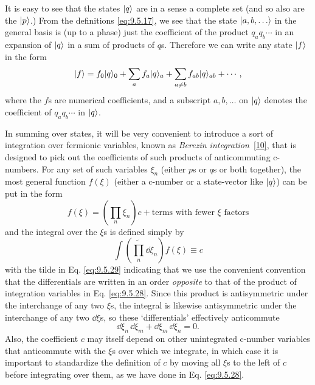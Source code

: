 It is easy to see that the states $\lvert q\rangle$ are in a sense a complete set (and
so also are the $\lvert p\rangle$.) From the definitions \eqref{eq:9.5.17}, we see that the
state $\lvert a,b,\ldots\rangle$ in the general basis is (up to a phase) just the
coefficient of the product $q_aq_b\cdots$ in an expansion of $\lvert q\rangle$ in a
sum of products of $q$s. Therefore we can write any state $\lvert f\rangle$ in the
form
\[
\lvert f\rangle=f_0\lvert q\rangle_0+\sum_a f_a\lvert q\rangle_a
 +\sum_{a\ne b}f_{ab}\lvert q\rangle_{ab}+\cdots,
\]
where the $f$s are numerical coefficients, and a subscript $a,b,\ldots$ on
$\lvert q\rangle$ denotes the coefficient of $q_aq_b\cdots$ in $\lvert q\rangle$.

In summing over states, it will be very convenient to introduce a sort of
integration over fermionic variables, known as \emph{Berezin integration}~\hyperref[ref:9.10]{[10]},
that is designed to pick out the coefficients of such products of
anticommuting c-numbers. For any set of such variables $\xi_n$ (either $p$s or
$q$s or both together), the most general function $f(\xi)$ (either a c-number
or a state-vector like $\lvert q\rangle$) can be put in the form
\begin{equation}
f(\xi)=\left(\prod_n\xi_n\right)c
 +\text{terms with fewer $\xi$ factors}
\tag{9.5.28}\label{eq:9.5.28}
\end{equation}
and the integral over the $\xi$s is defined simply by
\begin{equation}
\int\left(\widetilde{\prod_n}\dd\xi_n\right)f(\xi)\equiv c
\tag{9.5.29}\label{eq:9.5.29}
\end{equation}
with the tilde in Eq. \eqref{eq:9.5.29} indicating that we use the convenient convention
that the differentials are written in an order \emph{opposite} to that of the
product of integration variables in Eq. \eqref{eq:9.5.28}. Since this product is
antisymmetric under the interchange of any two $\xi$s, the integral is
likewise antisymmetric under the interchange of any two $\dd\xi$s, so these
`differentials' effectively anticommute
\begin{equation}
\dd\xi_n\,\dd\xi_m+\dd\xi_m\,\dd\xi_n=0.
\tag{9.5.30}\label{eq:9.5.30}
\end{equation}
Also, the coefficient $c$ may itself depend on other unintegrated c-number
variables that anticommute with the $\xi$s over which we integrate, in which
case it is important to standardize the definition of $c$ by moving all $\xi$s
to the left of $c$ before integrating over them, as we have done in Eq.
\eqref{eq:9.5.28}.

